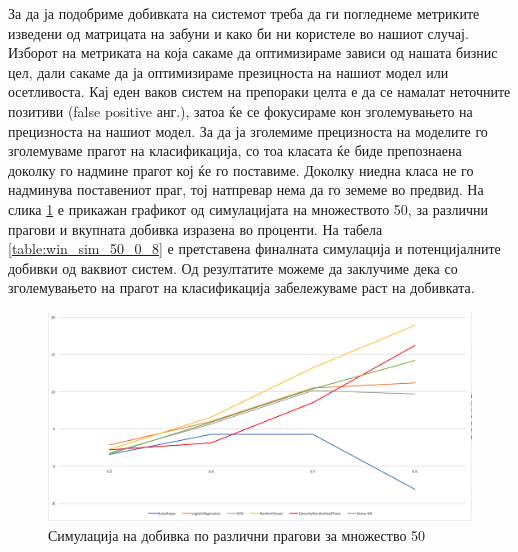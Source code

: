 За да ја подобриме добивката на системот треба да ги погледнеме метриките изведени од матрицата на забуни и како би ни користеле во нашиот случај. Изборот на метриката на која сакаме да оптимизираме зависи од нашата бизнис цел, дали сакаме да ја оптимизираме презицноста на нашиот модел или осетливоста. Кај еден ваков систем на препораки целта е да се намалат неточните позитиви (false positive анг.), затоа ќе се фокусираме кон зголемувањето на прецизноста на нашиот модел. За да ја зголемиме прецизноста на моделите го зголемуваме прагот на класификација, со тоа класата ќе биде препознаена доколку го надмине прагот кој ќе го поставиме. Доколку ниедна класа не го надминува поставениот праг, тој натпревар нема да го земеме во предвид. На слика \ref{fig:thresh_simulation_50} е прикажан графикот од симулацијата на множеството 50, за различни прагови и вкупната добивка изразена во проценти. На табела  \ref{table:win_sim_50_0_8} е претставена финалната симулација и потенцијалните добивки од ваквиот систем. Од резултатите можеме да заклучиме дека со зголемувањето на прагот на класификација забележуваме раст на добивката. 

\begin{figure}[H]
\centering
\includegraphics[scale=0.34]{images/thresh_simulation_50.png}
\caption{Симулација на добивка по различни прагови за множество 50}
\label{fig:thresh_simulation_50}
\centering
\end{figure}

 \begin{table}[H]
 \centering
\caption{Симулација на добивка за множеството 50 со праг на класификација од 0.8}
\centering
\label{table:win_sim_50_0_8}
\end{table}

